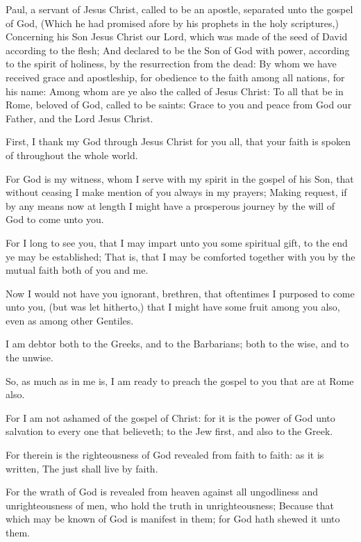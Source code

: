 \Chapter
\Verse Paul, a servant of Jesus Christ, called to be an apostle, separated unto the gospel of God, \Verse (Which he had promised afore by his prophets in the holy scriptures,) \Verse Concerning his Son Jesus Christ our Lord, which was made of the seed of David according to the flesh; \Verse And declared to be the Son of God with power, according to the spirit of holiness, by the resurrection from the dead: \Verse By whom we have received grace and apostleship, for obedience to the faith among all nations, for his name: \Verse Among whom are ye also the called of Jesus Christ: \Verse To all that be in Rome, beloved of God, called to be saints: Grace to you and peace from God our Father, and the Lord Jesus Christ.

\Verse First, I thank my God through Jesus Christ for you all, that your faith is spoken of throughout the whole world.

\Verse For God is my witness, whom I serve with my spirit in the gospel of his Son, that without ceasing I make mention of you always in my prayers; \Verse Making request, if by any means now at length I might have a prosperous journey by the will of God to come unto you.

\Verse For I long to see you, that I may impart unto you some spiritual gift, to the end ye may be established; \Verse That is, that I may be comforted together with you by the mutual faith both of you and me.

\Verse Now I would not have you ignorant, brethren, that oftentimes I purposed to come unto you, (but was let hitherto,) that I might have some fruit among you also, even as among other Gentiles.

\Verse I am debtor both to the Greeks, and to the Barbarians; both to the wise, and to the unwise.

\Verse So, as much as in me is, I am ready to preach the gospel to you that are at Rome also.

\Verse For I am not ashamed of the gospel of Christ: for it is the power of God unto salvation to every one that believeth; to the Jew first, and also to the Greek.

\Verse For therein is the righteousness of God revealed from faith to faith: as it is written, The just shall live by faith.

\Verse For the wrath of God is revealed from heaven against all ungodliness and unrighteousness of men, who hold the truth in unrighteousness; \Verse Because that which may be known of God is manifest in them; for God hath shewed it unto them.


